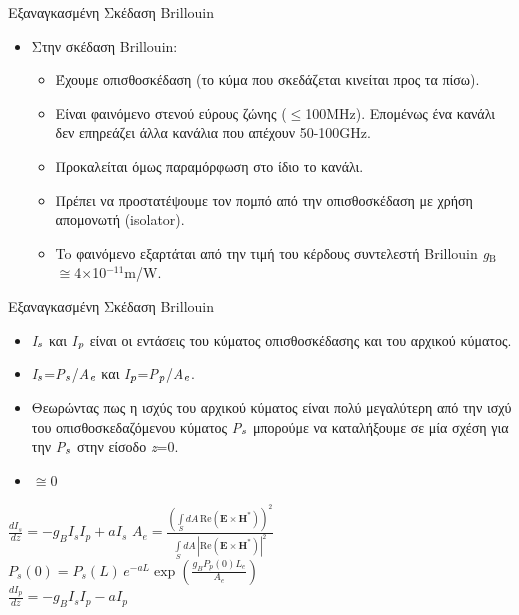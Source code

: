 \documentclass[11pt,aspectratio=169]{beamer}
\begin{document}
\begin{frame}[shrink=10,t]{Εξαναγκασμένη Σκέδαση Brillouin}
\begin{itemize}
\item Στην σκέδαση Brillouin:
\begin{itemize}
\item Έχουμε οπισθοσκέδαση (το κύμα που σκεδάζεται κινείται προς τα πίσω).
\item Είναι φαινόμενο στενού εύρους ζώνης (\ensuremath{\le}100ΜΗz). Επομένως ένα κανάλι δεν επηρεάζει άλλα κανάλια που απέχουν 50-100GHz.
\item Προκαλείται όμως παραμόρφωση στο ίδιο το κανάλι.
\item Πρέπει να προστατέψουμε τον πομπό από την οπισθοσκέδαση με χρήση απομονωτή (isolator).
\item To φαινόμενο εξαρτάται από την τιμή του κέρδους συντελεστή Brillouin \textit{g}$_{\text{B}}$\ensuremath{\cong}4\ensuremath{\times}10$^{-11}$m/W.
\end{itemize}
\end{itemize}
\end{frame}

\begin{frame}[shrink=20,t]{Εξαναγκασμένη Σκέδαση Brillouin}
\begin{itemize}
\item \textit{Ι}$_{\text{\textit{s}}}$ και \textit{I}$_{\text{\textit{p}}}$ είναι οι εντάσεις του κύματος οπισθοσκέδασης και του αρχικού κύματος.
\item \textit{Ι}$_{\text{\textit{s}}}$=\textit{P}$_{\text{\textit{s}}}$/\textit{A}$_{\text{\textit{e}}}$ και \textit{Ι}$_{\text{\textit{p}}}$=\textit{P}$_{\text{\textit{p}}}$/\textit{A}$_{\text{\textit{e}}}$.
\item Θεωρώντας πως η ισχύς του αρχικού κύματος είναι πολύ μεγαλύτερη από την ισχύ του οπισθοσκεδαζόμενου κύματος \textit{P}$_{\text{\textit{s}}}$ μπορούμε να καταλήξουμε σε μία σχέση για την \textit{P}$_{\text{\textit{s}}}$ στην είσοδο \textit{z}=0.
\end{itemize}
\medskip
\begin{itemize}
\item \ensuremath{\cong}0
\end{itemize}
\begin{center}
$\displaystyle \frac{dI_{s}}{dz}=-g_{B}I_{s}I_{p}+aI_{s}$ $\displaystyle A_{e}=\frac{\left(\int\limits_{S}dA\,\mathrm{Re}\left(\mathbf{E}\times\mathbf{H}^{*}\right)\right)^{2}}{\int\limits_{S}dA\,\left|\mathrm{Re}\left(\mathbf{E}\times\mathbf{H}^{*}\right)\right|^{2}}$\\[0.6ex]
$\displaystyle P_{s}(0)=P_{s}(L)\,e^{-aL}\exp\left(\frac{g_{B}P_{p}(0)L_{e}}{A_{e}}\right)$\\[0.6ex]
$\displaystyle \frac{dI_{p}}{dz}=-g_{B}I_{s}I_{p}-aI_{p}$\\[0.6ex]
\end{center}
\end{frame}
\end{document}
